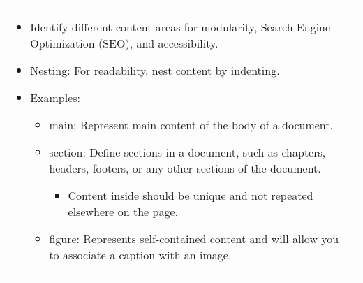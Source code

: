 \begin{summary}
\begin{center}
\begin{tabular}{ll}
{\begin{itemize}
                \item Identify different content areas for modularity, Search Engine Optimization (SEO), and accessibility. 
                \item Nesting: For readability, nest content by indenting.
                \item Examples:
                \begin{itemize}
                    \item main: Represent main content of the body of a document. 
                    \item section: Define sections in a document, such as chapters, headers, footers, or any other sections of the document.
                    \begin{itemize}
                        \item Content inside should be unique and not repeated elsewhere on the page.
                    \end{itemize}
                    \item figure: Represents self-contained content and will allow you to associate a caption with an image.
                \end{itemize}
            \end{itemize}} \\
        \end{tabular}
    \end{center}
\end{summary}
\newpage

